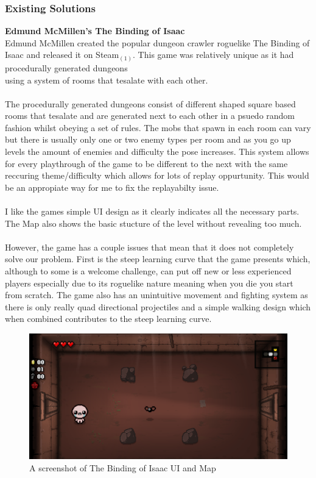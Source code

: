 \documentclass{article}
\begin{document}
        \subsubsection{Existing Solutions}
        \textbf{Edmund McMillen's The Binding of Isaac}\\
        Edmund McMillen created the popular dungeon crawler roguelike The Binding of Isaac and released it on Steam$_{(1)}$.
        This game was relatively unique as it had procedurally generated dungeons \\using a system of rooms that tesalate with each other.\\
        \\
        The procedurally generated dungeons consist of different shaped square based rooms that tesalate and are generated next to each other in a psuedo random fashion whilst obeying a set of rules. The mobs that spawn in each room can vary but there is usually only one or two enemy types per room and as you go up levels the amount of enemies and difficulty the pose increases. This system allows for every playthrough of the game to be different to the next with the same reccuring theme/difficulty which allows for lots of replay oppurtunity. This would be an appropiate way for me to fix the replayabilty issue.\\
        \\
        I like the games simple UI design as it clearly indicates all the necessary parts. The Map also shows the basic stucture of the level without revealing too much.\\
        \\
        However, the game has a couple issues that mean that it does not completely solve our problem. First is the steep learning curve that the game presents which, although to some is a welcome challenge, can put off new or less experienced players especially due to its roguelike nature meaning when you die you start from scratch. The game also has an unintuitive movement and fighting system as there is only really quad directional projectiles and a simple walking design which when combined contributes to the steep learning curve.\\
        \begin{figure}[h]
                \centering
                \includegraphics[scale=0.25]{images/research/BOI_Capture.PNG}
                \caption{A screenshot of The Binding of Isaac UI and Map}
                \label{fig:ie_0}
        \end{figure}
\end{document}
